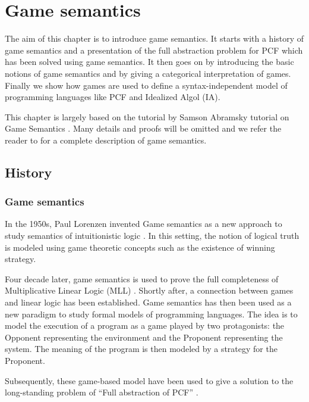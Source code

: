 \chapter{Game semantics}

The aim of this chapter is to introduce game semantics. It starts
with a history of game semantics and a presentation of the full
abstraction problem for PCF which has been solved using game
semantics. It then goes on by introducing the basic notions of game
semantics and by giving a categorical interpretation of games.
Finally we show how games are used to define a syntax-independent
model of programming languages like PCF and Idealized Algol (IA).

This chapter is largely based on the tutorial by Samson Abramsky
tutorial on Game Semantics \cite{abramsky:game-semantics-tutorial}.
Many details and proofs will be omitted and we refer the reader to
\cite{hylandong_pcf, abramsky94full} for a complete description of
game semantics.

\section{History}

\subsection{Game semantics}

In the 1950s, Paul Lorenzen invented Game semantics as a new
approach to study semantics of intuitionistic logic \citep{lor61}.
In this setting, the notion of logical truth is modeled using game
theoretic concepts such as the existence of winning strategy.

Four decade later, game semantics is used to prove the full
completeness of Multiplicative Linear Logic (MLL)
\citep{abramsky92games,HO93a}. Shortly after, a connection between
games and linear logic has been established. Game semantics has then
been used as a new paradigm to study formal models of programming
languages. The idea is to model the execution of a program as a game
played by two protagonists: the Opponent representing the
environment and the Proponent representing the system. The meaning
of the program is then modeled by a strategy for the Proponent.


Subsequently, these game-based model have been used to give a
solution to the long-standing problem of ``Full abstraction of PCF''
\citep{abramsky94full, hylandong_pcf,Nickau:lfcs94}.


